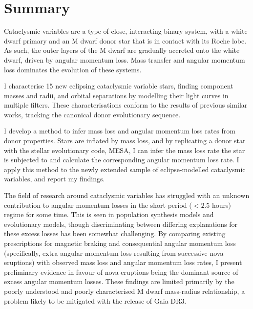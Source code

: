 \chapter*{Summary}

Cataclysmic variables are a type of close, interacting binary system, with a white dwarf primary and an M dwarf donor star that is in contact with its Roche lobe. As such, the outer layers of the M dwarf are gradually accreted onto the white dwarf, driven by angular momentum loss. Mass transfer and angular momentum loss dominates the evolution of these systems.

I characterise 15 new eclipsing cataclysmic variable stars, finding component masses and radii, and orbital separations by modelling their light curves in multiple filters. These characterisations conform to the results of previous similar works, tracking the canonical donor evolutionary sequence.

I develop a method to infer mass loss and angular momentum loss rates from donor properties. Stars are inflated by mass loss, and by replicating a donor star with the stellar evolutionary code, MESA, I can infer the mass loss rate the star is subjected to and calculate the corresponding angular momentum loss rate. I apply this method to the newly extended sample of eclipse-modelled cataclysmic variables, and report my findings.

The field of research around cataclysmic variables has struggled with an unknown contribution to angular momentum losses in the short period ($<2.5$ hours) regime for some time. This is seen in population synthesis models and evolutionary models, though discriminating between differing explanations for these excess losses has been somewhat challenging.
By comparing existing prescriptions for magnetic braking and consequential angular momentum loss (specifically, extra angular momentum loss resulting from successive nova eruptions) with observed mass loss and angular momentum loss rates, I present preliminary evidence in favour of nova eruptions being the dominant source of excess angular momentum losses.
These findings are limited primarily by the poorly understood and poorly characterised M dwarf mass-radius relationship, a problem likely to be mitigated with the release of Gaia DR3.